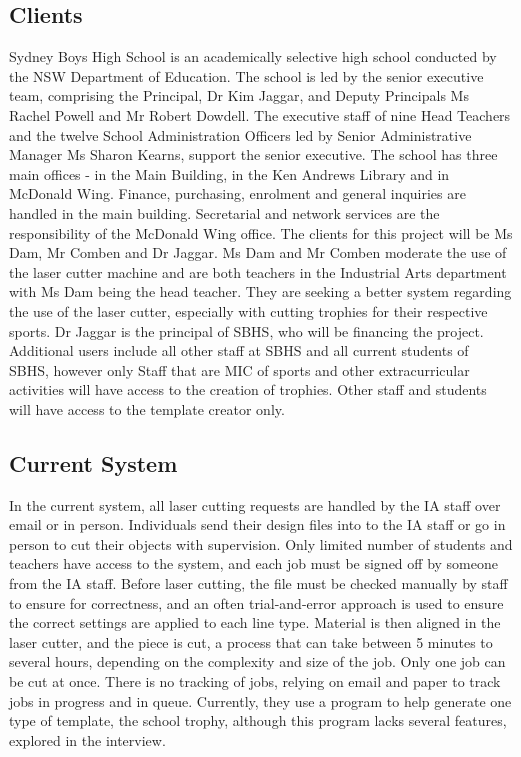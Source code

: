 \documentclass[oneside,openany,11pt,a4paper]{report}
\begin{document}
\subsection{Clients}
Sydney Boys High School is an academically selective high school conducted by the NSW Department of Education.
The school is led by the senior executive team, comprising the Principal, Dr Kim Jaggar, and Deputy Principals Ms Rachel Powell and Mr Robert Dowdell. The executive staff of nine Head Teachers and the twelve School Administration Officers led by Senior Administrative Manager Ms Sharon Kearns, support the senior executive. The school has three main offices - in the Main Building, in the Ken Andrews Library and in McDonald Wing. Finance, purchasing, enrolment and general inquiries are handled in the main building. Secretarial and network services are the responsibility of the McDonald Wing office.
The clients for this project will be Ms Dam, Mr Comben and Dr Jaggar. Ms Dam and Mr Comben moderate the use of the laser cutter machine and are both teachers in the Industrial Arts department with Ms Dam being the head teacher. They are seeking a better system regarding the use of the laser cutter, especially with cutting trophies for their respective sports. Dr Jaggar is the principal of SBHS, who will be financing the project. Additional users include all other staff at SBHS and all current students of SBHS, however only Staff that are MIC of sports and other extracurricular activities will have access to the creation of trophies. Other staff and students will have access to the template creator only.
\subsection{Current System}
In the current system, all laser cutting requests are handled by the IA staff over email or in person. Individuals send their design files into to the IA staff or go in person to cut their objects with supervision. Only limited number of students and teachers have access to the system, and each job must be signed off by someone from the IA staff. 
Before laser cutting, the file must be checked manually by staff to ensure for correctness, and an often trial-and-error approach is used to ensure the correct settings are applied to each line type. Material is then aligned in the laser cutter, and the piece is cut, a process that can take between 5 minutes to several hours, depending on the complexity and size of the job. Only one job can be cut at once. There is no tracking of jobs, relying on email and paper to track jobs in progress and in queue. Currently, they use a program to help generate one type of template, the school trophy, although this program lacks several features, explored in the interview.
\end{document}
